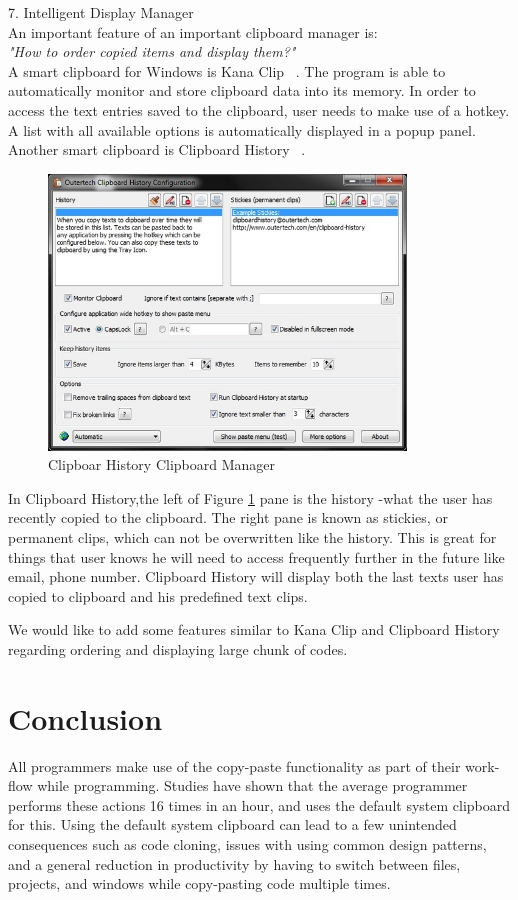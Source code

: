 \documentclass{acm_proc_article-sp}
\begin{document}
7. Intelligent Display Manager\\
An important feature of an important clipboard manager is:\\ \textit{"How to order copied items and display them?"}\\
A smart clipboard for Windows is Kana Clip ~\cite{KanaClip}. The program is able to automatically monitor and store clipboard data into its memory. In order to access the text entries saved to the clipboard, user needs to make use of a hotkey. A list with all available options is automatically displayed in a popup panel. Another smart clipboard is Clipboard History ~\cite{ClipHistory}.
 \begin{figure}[h]
 \centering
\includegraphics[width=9.5cm]{ClipHistory}
\caption{Clipboar History Clipboard Manager}
    \label{fig:Clip_History}
\end{figure} 
In Clipboard History,the left of Figure \ref{fig:Clip_History} pane is the history -what the user has recently copied to the clipboard. The right pane is known as stickies, or permanent clips, which can not be overwritten like the history. This is great for things that user knows he will need to access frequently further in the future like email, phone number. Clipboard History will display both the last texts user has copied to clipboard and his predefined text clips.  

We would like to add some features similar to Kana Clip and Clipboard History regarding ordering and displaying large chunk of codes. 

\section{Conclusion}
All programmers make use of the copy-paste functionality as part of their work-flow while programming. Studies have shown that the average programmer performs these actions 16 times in an hour, and uses the default system clipboard for this. Using the default system clipboard can lead to a few unintended consequences such as code cloning, issues with using common design patterns, and a general reduction in productivity by having to switch between files, projects, and windows while copy-pasting code multiple times.
\end{document}
